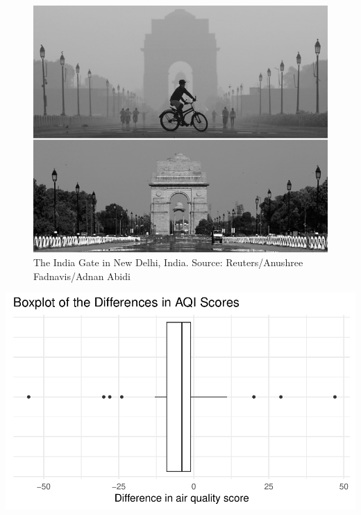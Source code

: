 \documentclass[
]{report}
\begin{document}
\begin{figure}

{\centering \includegraphics[width=0.6\linewidth]{images/air_pollution_greyscale} 

}

\caption{The India Gate in New Delhi, India. Source: Reuters/Anushree Fadnavis/Adnan Abidi}\label{fig:covid}
\end{figure}

\vspace{.05in}

\begin{center}\includegraphics[width=0.6\linewidth]{11-A09-paired-simulation_files/figure-latex/unnamed-chunk-2-1} \end{center}

\vspace{.2in}
\end{document}
